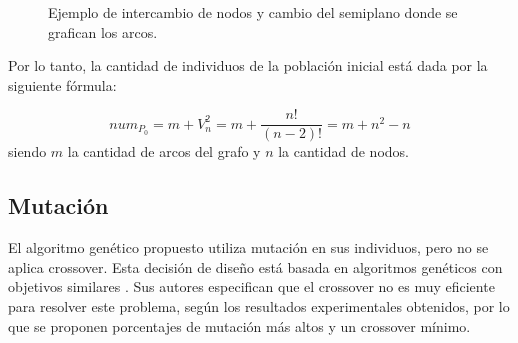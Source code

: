 	\begin{figure}[h]
		\centering
		\caption{Ejemplo de intercambio de nodos y cambio del semiplano donde se grafican los arcos.}
		\label{fig:ejemplo_mutacion}
	\end{figure}
	
	
	Por lo tanto, la cantidad de individuos de la población inicial está dada por la siguiente fórmula:
	
	$$num_{P_0} = m+V^2_n= m+ \frac{n!}{(n-2)!}=m+n^2-n $$siendo $m$ la cantidad de arcos del grafo y $n$ la cantidad de nodos.
	
	\subsection{Mutación}
	\label{subsec:mutacion}
	El algoritmo  genético propuesto utiliza   mutación en sus individuos, pero  no se aplica crossover. Esta decisión de  diseño está basada en 
	algoritmos genéticos  con  objetivos similares \cite{he2007parallelisation, eloranta2001timga}. Sus autores especifican que  el crossover no es muy eficiente para resolver este problema, según los resultados experimentales obtenidos, por lo que se proponen porcentajes de mutación más altos y un crossover mínimo.
	
